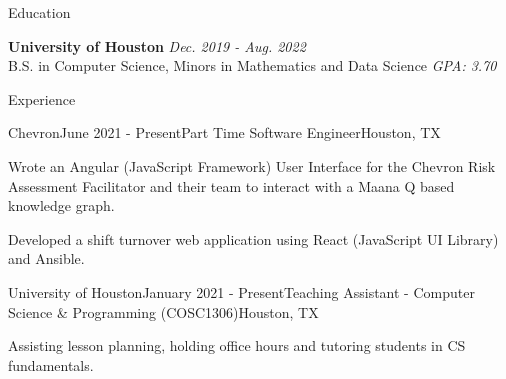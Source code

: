 \documentclass{resume} %
\begin{document}

\begin{rSection}{Education}

{\bf University of Houston} \hfill {\em Dec. 2019 - Aug. 2022} \\ 
{ B.S. in Computer Science, Minors in Mathematics and Data Science} \hfill {\em GPA: 3.70}\\


\end{rSection}



\begin{rSection}{Experience}
\begin{rSubsection}{Chevron}{June 2021 - Present}{Part Time Software Engineer}{Houston, TX}
\item Wrote an Angular (JavaScript Framework) User Interface for the Chevron Risk Assessment Facilitator and their team to interact with a Maana Q based knowledge graph.
\item Developed a shift turnover web application using React (JavaScript UI Library) and Ansible.
\end{rSubsection}

\begin{rSubsection}{University of Houston}{January 2021 - Present}{Teaching Assistant - Computer Science \& Programming (COSC1306)}{Houston, TX}
\item Assisting lesson planning, holding office hours and tutoring students in CS fundamentals.
\end{rSubsection}



\end{rSection}

\end{document}
